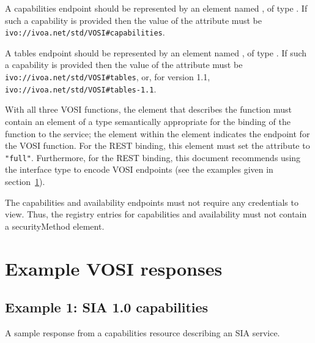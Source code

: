 \documentclass[11pt,letter]{ivoa}
\begin{document}
A capabilities endpoint should be represented by an element named , of type . If such a capability is provided then the value of the  attribute must be \nolinkurl{ivo://ivoa.net/std/VOSI#capabilities}.

A tables endpoint should be represented by an element named , of type . If such a capability is provided then the value of the  attribute must be \nolinkurl{ivo://ivoa.net/std/VOSI\#tables}, or, for version 1.1, \nolinkurl{ivo://ivoa.net/std/VOSI\#tables-1.1}.

With all three VOSI functions, the  element that describes the function must contain an  element of a type semantically appropriate for the binding of the function to the service; the  element within the  element indicates the endpoint for the VOSI function. For the REST binding, this  element must set the  attribute to \texttt{"full"}. Furthermore, for the REST binding, this document recommends using the  interface type to encode VOSI endpoints (see the examples given in section~\ref{sec:examples}). 

The capabilities and availability endpoints must not require any credentials to view.  Thus, the  registry entries for capabilities and availability must not contain a securityMethod element.

\section{Example VOSI responses}
\label{sec:examples}

\subsection{Example 1: SIA 1.0 capabilities}

A sample response from a capabilities resource describing an SIA service. 
\end{document}
